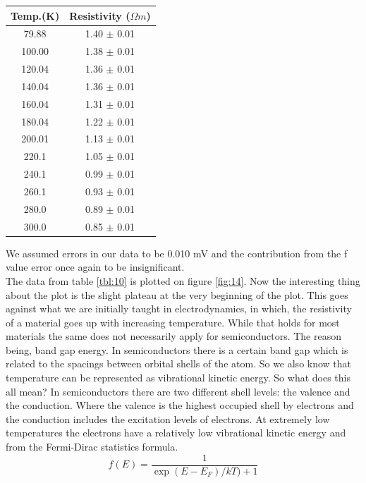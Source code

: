 \documentclass[twocolumn]{article}
\begin{document}
\begin{minipage}{\linewidth}
\Centering
\begin{tabular}{|c|c|}
\hline
Temp.(K) & Resistivity ($\Omega m$) \\ \hline
79.88 & 1.40 $\pm$ 0.01 \\ \hline
100.00 & 1.38 $\pm$ 0.01 \\ \hline
120.04 & 1.36 $\pm$ 0.01 \\ \hline
140.04 & 1.36 $\pm$ 0.01 \\ \hline
160.04 & 1.31 $\pm$ 0.01 \\ \hline
180.04 & 1.22 $\pm$ 0.01 \\ \hline
200.01 & 1.13 $\pm$ 0.01 \\ \hline
220.1 & 1.05 $\pm$ 0.01 \\ \hline
240.1 & 0.99 $\pm$ 0.01 \\ \hline
260.1 & 0.93 $\pm$ 0.01 \\ \hline
280.0 & 0.89 $\pm$ 0.01 \\ \hline
300.0 & 0.85 $\pm$ 0.01 \\ \hline
\end{tabular}
\label{tbl:10}
\end{minipage}
We assumed errors in our data to be 0.010 mV and the contribution from the f 
value error once again to be insignificant.
\\
The data from table \ref{tbl:10} is plotted on figure \ref{fig:14}. Now the 
interesting thing about the plot is the slight plateau at the very beginning 
of the plot. This goes against what we are initially taught in electrodynamics, 
in which, the resistivity of a material goes up with increasing temperature. 
While that holds for most materials the same does not necessarily apply for 
semiconductors. The reason being, band gap energy. In semiconductors there is a 
certain band gap which is related to the spacings between orbital shells of 
the atom. So we also know that temperature can be represented as vibrational 
kinetic energy. So what does this all mean? In semiconductors there are two 
different shell levels: the valence and the conduction. Where the valence is 
the highest occupied shell by electrons and the conduction includes the 
excitation levels of electrons. At extremely low temperatures the electrons 
have a relatively low vibrational kinetic energy and from the Fermi-Dirac 
statistics formula.
\begin{equation}
f(E) = \frac{1}{\exp{(E-E_{F})/kT)}+1}
\label{eqn:18}
\end{equation}
\end{document}
